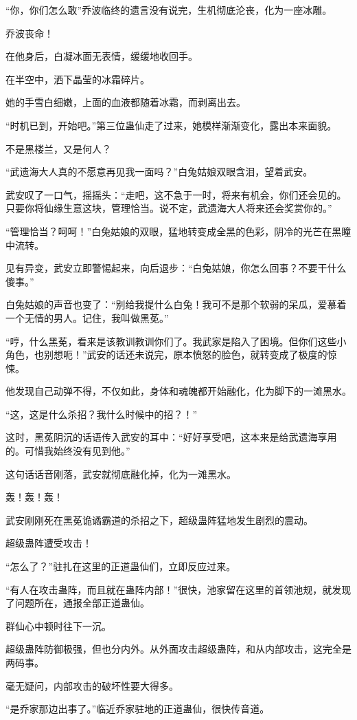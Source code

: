 \begin{this_body}
“你，你们怎么敢”乔波临终的遗言没有说完，生机彻底沦丧，化为一座冰雕。

乔波丧命！

在他身后，白凝冰面无表情，缓缓地收回手。

在半空中，洒下晶莹的冰霜碎片。

她的手雪白细嫩，上面的血液都随着冰霜，而剥离出去。

“时机已到，开始吧。”第三位蛊仙走了过来，她模样渐渐变化，露出本来面貌。

不是黑楼兰，又是何人？

“武遗海大人真的不愿意再见我一面吗？”白兔姑娘双眼含泪，望着武安。

武安叹了一口气，摇摇头：“走吧，这不急于一时，将来有机会，你们还会见的。只要你将仙缘生意这块，管理恰当。说不定，武遗海大人将来还会奖赏你的。”

“管理恰当？呵呵！”白兔姑娘的双眼，猛地转变成全黑的色彩，阴冷的光芒在黑瞳中流转。

见有异变，武安立即警惕起来，向后退步：“白兔姑娘，你怎么回事？不要干什么傻事。”

白兔姑娘的声音也变了：“别给我提什么白兔！我可不是那个软弱的呆瓜，爱慕着一个无情的男人。记住，我叫做黑莬。”

“哼，什么黑莬，看来是该教训教训你们了。我武家是陷入了困境。但你们这些小角色，也别想呃！”武安的话还未说完，原本愤怒的脸色，就转变成了极度的惊悚。

他发现自己动弹不得，不仅如此，身体和魂魄都开始融化，化为脚下的一滩黑水。

“这，这是什么杀招？我什么时候中的招？！”

这时，黑莬阴沉的话语传入武安的耳中：“好好享受吧，这本来是给武遗海享用的。可惜我始终没有见到他。”

这句话话音刚落，武安就彻底融化掉，化为一滩黑水。

轰！轰！轰！

武安刚刚死在黑莬诡谲霸道的杀招之下，超级蛊阵猛地发生剧烈的震动。

超级蛊阵遭受攻击！

“怎么了？”驻扎在这里的正道蛊仙们，立即反应过来。

“有人在攻击蛊阵，而且就在蛊阵内部！”很快，池家留在这里的首领池规，就发现了问题所在，通报全部正道蛊仙。

群仙心中顿时往下一沉。

超级蛊阵防御极强，但也分内外。从外面攻击超级蛊阵，和从内部攻击，这完全是两码事。

毫无疑问，内部攻击的破坏性要大得多。

“是乔家那边出事了。”临近乔家驻地的正道蛊仙，很快传音道。


\end{this_body}

